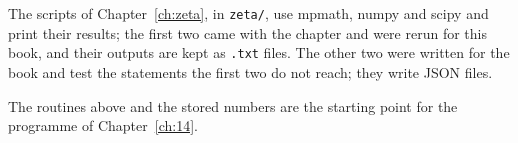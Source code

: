 The scripts of Chapter~\ref{ch:zeta}, in \texttt{zeta/}, use mpmath, numpy and scipy and print their results; the first two came with the chapter and were rerun for this book, and their outputs are kept as \texttt{.txt} files. The other two were written for the book and test the statements the first two do not reach; they write JSON files.


The routines above and the stored numbers are the starting point for the programme of Chapter~\ref{ch:14}.
